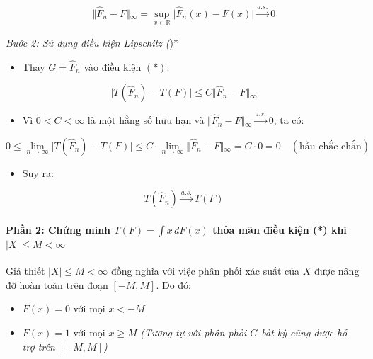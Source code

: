 \documentclass[12pt,a4paper]{article}
\begin{document}
\[\Vert{}\widehat{F}_n - F\Vert{}_\infty = \sup_{x \in \mathbb{R}} \vert{}\widehat{F}_n(x) - F(x)\vert{} \xrightarrow{a.s.} 0\]

\emph{Bước 2: Sử dụng điều kiện Lipschitz (})*

\begin{itemize}

\item
  Thay \(G = \widehat{F}_n\) vào điều kiện \((*)\):
\end{itemize}

\[\vert{}T(\widehat{F}_n) - T(F)\vert{} \le C \Vert{}\widehat{F}_n - F\Vert{}_\infty\]

\begin{itemize}

\item
  Vì \(0 < C < \infty\) là một hằng số hữu hạn và \(\Vert{}\widehat{F}_n - F\Vert{}_\infty \xrightarrow{a.s.} 0\), ta có:
\end{itemize}

\[0 \le \lim_{n \to \infty} \vert{}T(\widehat{F}_n) - T(F)\vert{} \le C \cdot \lim_{n \to \infty} \Vert{}\widehat{F}_n - F\Vert{}_\infty = C \cdot 0 = 0 \quad (\text{hầu chắc chắn})\]

\begin{itemize}

\item
  Suy ra:
\end{itemize}

\[T(\widehat{F}_n) \xrightarrow{a.s.} T(F)\]

\paragraph{\texorpdfstring{Phần 2: Chứng minh \(T(F) = \int x \, dF(x)\) thỏa mãn điều kiện (*) khi \(\vert{}X\vert{} \le M < \infty\)}{Phần 2: Chứng minh T(F) = \textbackslash int x \textbackslash, dF(x) thỏa mãn điều kiện (*) khi \textbackslash vert\{\}X\textbackslash vert\{\} \textbackslash le M \textless{} \textbackslash infty}}\label{phux1ea7n-2-chux1ee9ng-minh-tf-int-x-dfx-thux1ecfa-muxe3n-ux111iux1ec1u-kiux1ec7n-khi-vertxvert-le-m-infty}

Giả thiết \(\vert{}X\vert{} \le M < \infty\) đồng nghĩa với việc phân phối xác suất của \(X\) được nâng đỡ hoàn toàn trên đoạn \([-M, M]\).
Do đó:

\begin{itemize}

\item
  \(F(x) = 0\) với mọi \(x < -M\)
\item
  \(F(x) = 1\) với mọi \(x \ge M\)
  \emph{(Tương tự với phân phối \(G\) bất kỳ cũng được hỗ trợ trên \([-M, M]\))}
\end{itemize}
\end{document}
